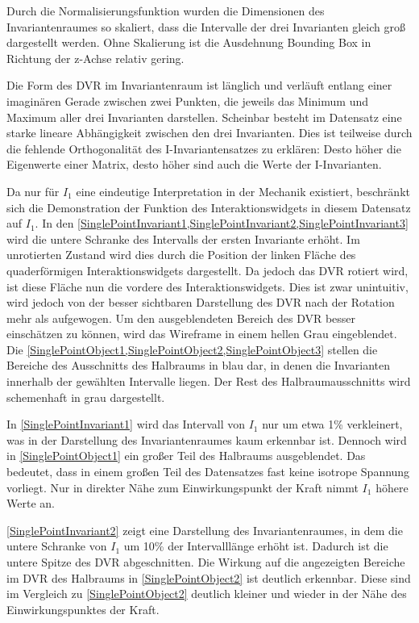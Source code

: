 \documentclass[a4paper,fontsize=12pt,toc=bib,parskip=half,ngerman]{scrartcl}
\begin{document}
Durch die Normalisierungsfunktion wurden die Dimensionen des Invariantenraumes so skaliert, dass die Intervalle der drei Invarianten gleich gro{\ss} dargestellt werden. Ohne Skalierung ist die Ausdehnung Bounding Box in Richtung der z-Achse relativ gering.

Die Form des DVR im Invariantenraum ist l\"anglich und verl\"auft entlang einer imagin\"aren Gerade zwischen zwei Punkten, die jeweils das Minimum und Maximum aller drei Invarianten darstellen. Scheinbar besteht im Datensatz eine starke lineare Abh\"angigkeit zwischen den drei Invarianten. Dies ist teilweise durch die fehlende Orthogonalit\"at des I-Invariantensatzes zu erkl\"aren: Desto h\"oher die Eigenwerte einer Matrix, desto h\"oher sind auch die Werte der I-Invarianten.  

Da nur f\"ur $I_1$ eine eindeutige Interpretation in der Mechanik existiert, beschr\"ankt sich die Demonstration der Funktion des Interaktionswidgets in diesem Datensatz auf $I_1$. In den \cref{SinglePointInvariant1,SinglePointInvariant2,SinglePointInvariant3} wird die untere Schranke des Intervalls der ersten Invariante erh\"oht. Im unrotierten Zustand wird dies durch die Position der linken Fl\"ache des quaderf\"ormigen Interaktionswidgets dargestellt. Da jedoch das DVR rotiert wird, ist diese Fl\"ache nun die vordere des Interaktionswidgets. Dies ist zwar unintuitiv, wird jedoch von der besser sichtbaren Darstellung des DVR nach der Rotation mehr als aufgewogen. Um den ausgeblendeten Bereich des DVR besser einsch\"atzen zu k\"onnen, wird das Wireframe in einem hellen Grau eingeblendet. Die \cref{SinglePointObject1,SinglePointObject2,SinglePointObject3} stellen die Bereiche des Ausschnitts des Halbraums in blau dar, in denen die Invarianten innerhalb der gew\"ahlten Intervalle liegen. Der Rest des Halbraumausschnitts wird schemenhaft in grau dargestellt.

In \cref{SinglePointInvariant1} wird das Intervall von $I_1$ nur um etwa 1\% verkleinert, was in der Darstellung des Invariantenraumes kaum erkennbar ist. Dennoch wird in \cref{SinglePointObject1} ein gro{\ss}er Teil des Halbraums ausgeblendet. Das bedeutet, dass in einem gro{\ss}en Teil des Datensatzes fast keine isotrope Spannung vorliegt. Nur in direkter N\"ahe zum Einwirkungspunkt der Kraft nimmt $I_1$ h\"ohere Werte an. 

\cref{SinglePointInvariant2} zeigt eine Darstellung des Invariantenraumes, in dem die untere Schranke von $I_1$ um 10\% der Intervalll\"ange erh\"oht ist. Dadurch ist die untere Spitze des DVR abgeschnitten. Die Wirkung auf die angezeigten Bereiche im DVR des Halbraums in \cref{SinglePointObject2} ist deutlich erkennbar. Diese sind im Vergleich zu \cref{SinglePointObject2} deutlich kleiner und wieder in der N\"ahe des Einwirkungspunktes der Kraft. 
\end{document}
